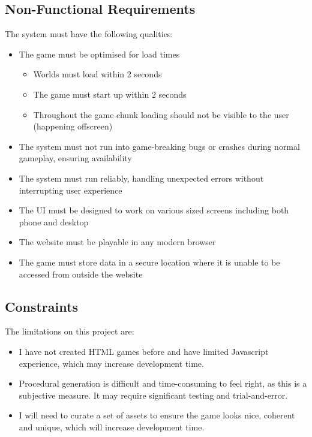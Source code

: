 \documentclass[14pt]{article}
\begin{document}
\subsection{Non-Functional Requirements}
The system must have the following qualities:
\begin{itemize}
  \item The game must be optimised for load times
  \begin{itemize}
    \item Worlds must load within 2 seconds
    \item The game must start up within 2 seconds
    \item Throughout the game chunk loading should not be visible to the user (happening offscreen)
  \end{itemize}
  \item The system must not run into game-breaking bugs or crashes during normal gameplay, ensuring availability
  \item The system must run reliably, handling unexpected errors without interrupting user experience
  \item The UI must be designed to work on various sized screens including both phone and desktop
  \item The website must be playable in any modern browser
  \item The game must store data in a secure location where it is unable to be accessed from outside the website
\end{itemize}

\subsection{Constraints}
The limitations on this project are:
\begin{itemize}
    \item I have not created HTML games before and have limited Javascript experience, which may increase development time.
    \item Procedural generation is difficult and time-consuming to feel right, as this is a subjective measure. It may require significant testing and trial-and-error.
    \item I will need to curate a set of assets to ensure the game looks nice, coherent and unique, which will increase development time.
\end{itemize}
\end{document}
